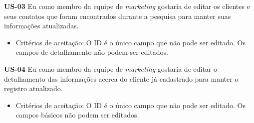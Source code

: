 \textbf{US-03} Eu como membro da equipe de \textit{marketing} gostaria de editar os clientes e seus contatos que foram encontrados durante a pesquisa para manter suas informações atualizadas.

\begin{itemize}
  \item Critérios de aceitação:
\subitem O ID é o único campo que não pode ser editado.
\subitem Os campos de detalhamento não podem ser editados.
 
\end{itemize}


\textbf{US-04} Eu como membro da equipe de \textit{marketing} gostaria de editar o detalhamento das informações acerca do cliente já cadastrado para manter o registro atualizado.
\begin{itemize}
\item Critérios de aceitação:
\subitem O ID é o único campo que não pode ser editado.
\subitem Os campos básicos não podem ser editados.

\end{itemize}




